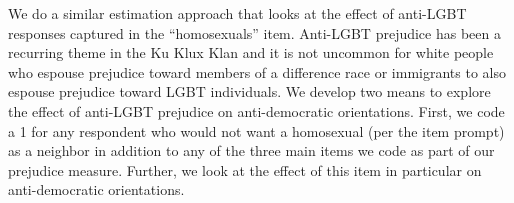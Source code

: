 \documentclass[11pt,]{article}
\begin{document}
We do a similar estimation approach that looks at the effect of
anti-LGBT responses captured in the ``homosexuals'' item. Anti-LGBT
prejudice has been a recurring theme in the Ku Klux Klan \citep[for
example]{gibson1987hkkk} and it is not uncommon for white people who
espouse prejudice toward members of a difference race or immigrants to
also espouse prejudice toward LGBT individuals. We develop two means to
explore the effect of anti-LGBT prejudice on anti-democratic
orientations. First, we code a 1 for any respondent who would not want a
homosexual (per the item prompt) as a neighbor in addition to any of the
three main items we code as part of our prejudice measure. Further, we
look at the effect of this item in particular on anti-democratic
orientations.

 
  \providecommand{\huxb}[2]{\arrayrulecolor[RGB]{#1}\global\arrayrulewidth=#2pt}
  \providecommand{\huxvb}[2]{\color[RGB]{#1}\vrule width #2pt}
  \providecommand{\huxtpad}[1]{\rule{0pt}{\baselineskip+#1}}
  \providecommand{\huxbpad}[1]{\rule[-#1]{0pt}{#1}}
\end{document}
